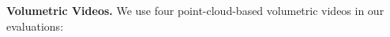 




\label{sec:eval-setup}
\textbf{Volumetric Videos.} We use four point-cloud-based volumetric videos in our evaluations:

